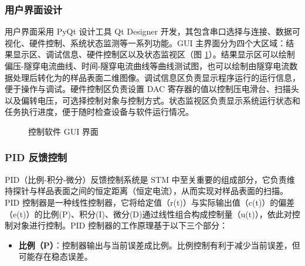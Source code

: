 \documentclass{article}
\begin{document}
\begin{spacing}{1.5}
	
	\subsubsection{用户界面设计}
	用户界面采用 PyQt 设计工具 Qt Designer 开发，其包含串口选择与连接、数据可视化、硬件控制、系统状态监测等一系列功能。GUI 主界面分为四个大区域：结果显示区、调试信息、硬件控制区以及状态监视区（图 \ref{fig19}）。结果显示区可以绘制偏压-隧穿电流曲线、时间-隧穿电流曲线等曲线测试图，也可以绘制由隧穿电流数据处理后转化为的样品表面二维图像。调试信息区负责显示程序运行的运行信息，便于操作与调试。硬件控制区负责设置 DAC 寄存器的值以控制压电滑台、扫描头以及偏转电压，可选择控制对象与控制方式。状态监视区负责显示系统运行状态和任务执行进度，便于随时检查设备与软件运行情况。
	
	\begin{figure}[!h]
		\centering
		\caption{控制软件 GUI 界面}
		\label{fig19}
	\end{figure}
	
	
	
	\subsubsection{PID 反馈控制}		
	PID（比例-积分-微分）反馈控制系统是 STM 中至关重要的组成部分，它负责维持探针与样品表面之间的恒定距离（恒定电流），从而实现对样品表面的扫描。PID 控制器是一种线性控制器，它将给定值（r(t)）与实际输出值（c(t)）的偏差（e(t)）的比例(P)、积分(I)、微分(D)通过线性组合构成控制量（u(t)），依此对控制对象进行控制\cite{ref20}。PID 控制器的工作原理基于以下三个部分：
	\begin{itemize}
		\item \textbf{比例（P）}：控制器输出与当前误差成比例。比例控制有利于减少当前误差，但可能存在稳态误差。
		

\end{itemize}
\end{spacing}
\end{document}
